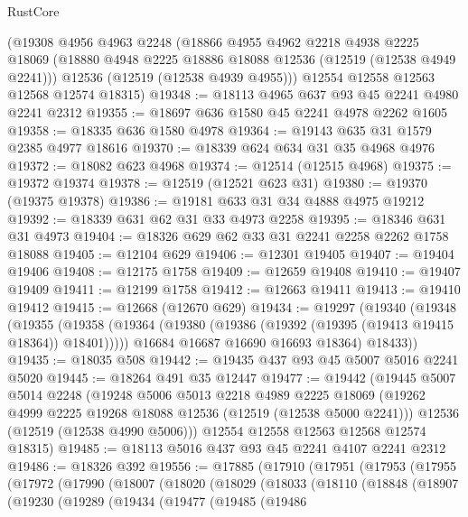 \begin{lexlean}{RustCore}
\begin{coremodule}
    (@19308
      @4956
      @4963
      @2248
      (@18866
        @4955
        @4962
        @2218
        @4938
        @2225
        @18069
        (@18880 @4948 @2225 @18886 @18088 @12536 (@12519 (@12538 @4949 @2241)))
        @12536
        (@12519 (@12538 @4939 @4955)))
      @12554
      @12558
      @12563
      @12568
      @12574
      @18315)
@19348 := @18113 @4965 @637 @93 @45 @2241 @4980 @2241 @2312
@19355 := @18697 @636 @1580 @45 @2241 @4978 @2262 @1605
@19358 := @18335 @636 @1580 @4978
@19364 := @19143 @635 @31 @1579 @2385 @4977 @18616
@19370 := @18339 @624 @634 @31 @35 @4968 @4976
@19372 := @18082 @623 @4968
@19374 := @12514 (@12515 @4968)
@19375 := @19372 @19374
@19378 := @12519 (@12521 @623 @31)
@19380 := @19370 (@19375 @19378)
@19386 := @19181 @633 @31 @34 @4888 @4975 @19212
@19392 := @18339 @631 @62 @31 @33 @4973 @2258
@19395 := @18346 @631 @31 @4973
@19404 := @18326 @629 @62 @33 @31 @2241 @2258 @2262 @1758 @18088
@19405 := @12104 @629
@19406 := @12301 @19405
@19407 := @19404 @19406
@19408 := @12175 @1758
@19409 := @12659 @19408
@19410 := @19407 @19409
@19411 := @12199 @1758
@19412 := @12663 @19411
@19413 := @19410 @19412
@19415 := @12668 (@12670 @629)
@19434 := @19297
    (@19340
      (@19348
        (@19355
          (@19358 (@19364 (@19380 (@19386 (@19392 (@19395 (@19413 @19415 @18364)) @18401)))))
          @16684
          @16687
          @16690
          @16693
          @18364)
        @18433))
@19435 := @18035 @508
@19442 := @19435 @437 @93 @45 @5007 @5016 @2241 @5020
@19445 := @18264 @491 @35 @12447
@19477 := @19442
    (@19445
      @5007
      @5014
      @2248
      (@19248
        @5006
        @5013
        @2218
        @4989
        @2225
        @18069
        (@19262 @4999 @2225 @19268 @18088 @12536 (@12519 (@12538 @5000 @2241)))
        @12536
        (@12519 (@12538 @4990 @5006)))
      @12554
      @12558
      @12563
      @12568
      @12574
      @18315)
@19485 := @18113 @5016 @437 @93 @45 @2241 @4107 @2241 @2312
@19486 := @18326 @392
@19556 := @17885
    (@17910
      (@17951
        (@17953
          (@17955
            (@17972
              (@17990
                (@18007
                  (@18020
                    (@18029
                      (@18033
                        (@18110
                          (@18848
                            (@18907
                              (@19230
                                (@19289
                                  (@19434
                                    (@19477
                                      (@19485
                                        (@19486

\end{coremodule}
\end{lexlean}
